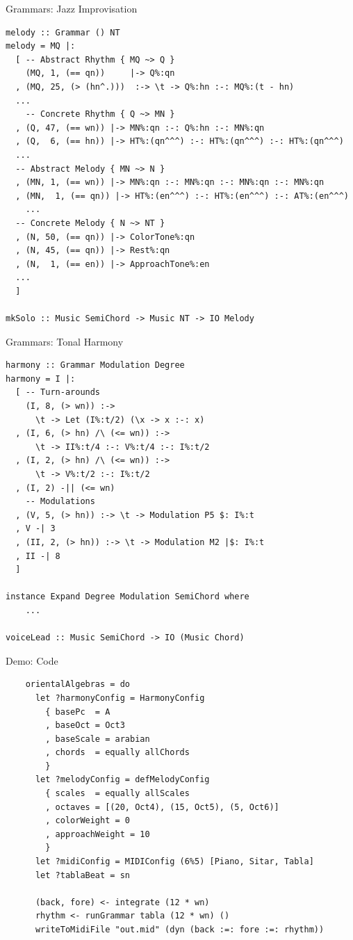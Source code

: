 \documentclass{beamer}
\begin{document}
	\begin{frame}[fragile=singleslide]{Grammars: Jazz Improvisation}
	\begin{verbatim}
melody :: Grammar () NT
melody = MQ |:
  [ -- Abstract Rhythm { MQ ~> Q }
    (MQ, 1, (== qn))     |-> Q%:qn
  , (MQ, 25, (> (hn^.)))  :-> \t -> Q%:hn :-: MQ%:(t - hn)
  ...
    -- Concrete Rhythm { Q ~> MN }
  , (Q, 47, (== wn)) |-> MN%:qn :-: Q%:hn :-: MN%:qn
  , (Q,  6, (== hn)) |-> HT%:(qn^^^) :-: HT%:(qn^^^) :-: HT%:(qn^^^)
  ...
  -- Abstract Melody { MN ~> N }
  , (MN, 1, (== wn)) |-> MN%:qn :-: MN%:qn :-: MN%:qn :-: MN%:qn
  , (MN,  1, (== qn)) |-> HT%:(en^^^) :-: HT%:(en^^^) :-: AT%:(en^^^)
    ...
  -- Concrete Melody { N ~> NT }
  , (N, 50, (== qn)) |-> ColorTone%:qn
  , (N, 45, (== qn)) |-> Rest%:qn
  , (N,  1, (== en)) |-> ApproachTone%:en
  ...
  ]

mkSolo :: Music SemiChord -> Music NT -> IO Melody
    \end{verbatim}
	\end{frame}

	\begin{frame}[fragile=singleslide]{Grammars: Tonal Harmony}
	\begin{verbatim}
harmony :: Grammar Modulation Degree
harmony = I |:
  [ -- Turn-arounds
    (I, 8, (> wn)) :->
      \t -> Let (I%:t/2) (\x -> x :-: x)
  , (I, 6, (> hn) /\ (<= wn)) :->
      \t -> II%:t/4 :-: V%:t/4 :-: I%:t/2
  , (I, 2, (> hn) /\ (<= wn)) :->
      \t -> V%:t/2 :-: I%:t/2
  , (I, 2) -|| (<= wn)
    -- Modulations
  , (V, 5, (> hn)) :-> \t -> Modulation P5 $: I%:t
  , V -| 3
  , (II, 2, (> hn)) :-> \t -> Modulation M2 |$: I%:t
  , II -| 8
  ]

instance Expand Degree Modulation SemiChord where
    ...

voiceLead :: Music SemiChord -> IO (Music Chord)
	\end{verbatim}
	\end{frame}
	
	\begin{frame}[fragile=singleslide]{Demo: Code}
	\begin{verbatim}
    orientalAlgebras = do
      let ?harmonyConfig = HarmonyConfig
        { basePc  = A
        , baseOct = Oct3
        , baseScale = arabian
        , chords  = equally allChords
        }
      let ?melodyConfig = defMelodyConfig
        { scales  = equally allScales
        , octaves = [(20, Oct4), (15, Oct5), (5, Oct6)]
        , colorWeight = 0
        , approachWeight = 10
        }
      let ?midiConfig = MIDIConfig (6%5) [Piano, Sitar, Tabla]
      let ?tablaBeat = sn
      
      (back, fore) <- integrate (12 * wn)
      rhythm <- runGrammar tabla (12 * wn) ()
      writeToMidiFile "out.mid" (dyn (back :=: fore :=: rhythm))
	\end{verbatim}
  	\end{frame}
	
\end{document}
